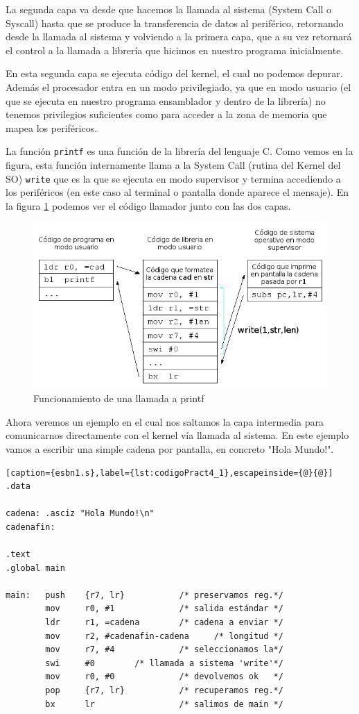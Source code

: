 La segunda capa va desde que hacemos la llamada al sistema (System Call o Syscall) hasta que se
produce la transferencia de datos al periférico, retornando desde la llamada
al sistema y volviendo a la primera capa, que a su vez retornará el control
a la llamada a librería que hicimos en nuestro programa inicialmente.

En esta segunda capa se ejecuta código del kernel, el cual no podemos depurar.
Además el procesador entra en un modo privilegiado, ya que en modo usuario (el
que se ejecuta en nuestro programa ensamblador y dentro de la librería) no
tenemos privilegios suficientes como para acceder a la zona de memoria que
mapea los periféricos.

La función {\tt printf} es una función de la librería del lenguaje C. Como vemos en
la figura, esta función internamente llama a la System Call (rutina del Kernel del SO)
{\tt write} que es la que se ejecuta en modo supervisor y termina accediendo a
los periféricos (en este caso al terminal o pantalla donde aparece el mensaje). En la
figura \ref{fig:capas} podemos ver el código llamador junto con las dos capas.

\begin{figure}[h]
  \centering
    \includegraphics[width=13cm]{graphs/capas.png}
  \caption{Funcionamiento de una llamada a printf}
  \label{fig:capas}
\end{figure}

Ahora veremos un ejemplo en el cual nos saltamos la capa intermedia para
comunicarnos directamente con el kernel vía llamada al sistema. En este ejemplo
vamos a escribir una simple cadena por pantalla, en concreto "Hola Mundo!".

\begin{lstlisting}[caption={esbn1.s},label={lst:codigoPract4_1},escapeinside={@}{@}]
.data

cadena: .asciz "Hola Mundo!\n"
cadenafin:

.text
.global main
 
main:   push    {r7, lr}           /* preservamos reg.*/
        mov     r0, #1             /* salida estándar */
        ldr     r1, =cadena        /* cadena a enviar */
        mov     r2, #cadenafin-cadena     /* longitud */
        mov     r7, #4             /* seleccionamos la*/
        swi     #0        /* llamada a sistema 'write'*/
        mov     r0, #0             /* devolvemos ok   */
        pop     {r7, lr}           /* recuperamos reg.*/
        bx      lr                 /* salimos de main */
\end{lstlisting}

